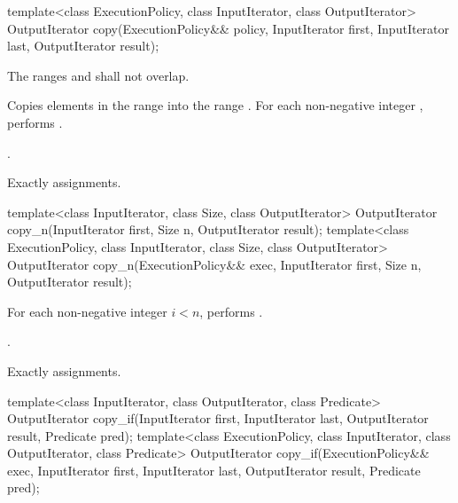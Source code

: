 %
\begin{itemdecl}
template<class ExecutionPolicy, class InputIterator, class OutputIterator>
  OutputIterator copy(ExecutionPolicy&& policy, InputIterator first, InputIterator last,
                      OutputIterator result);
\end{itemdecl}

\begin{itemdescr}
\pnum
\requires The ranges  and
 shall not overlap.

\pnum
\effects Copies elements in the range  into
the range .
For each non-negative integer ,
performs .

\pnum
\returns {}.

\pnum
\complexity Exactly  assignments.
\end{itemdescr}

%
\begin{itemdecl}
template<class InputIterator, class Size, class OutputIterator>
  OutputIterator copy_n(InputIterator first, Size n,
                        OutputIterator result);
template<class ExecutionPolicy, class InputIterator, class Size, class OutputIterator>
  OutputIterator copy_n(ExecutionPolicy&& exec,
                        InputIterator first, Size n,
                        OutputIterator result);
\end{itemdecl}

\begin{itemdescr}
\pnum
\effects For each non-negative integer
$i < n$, performs .

\pnum
\returns {}.

\pnum
\complexity Exactly  assignments.
\end{itemdescr}

%
\begin{itemdecl}
template<class InputIterator, class OutputIterator, class Predicate>
  OutputIterator copy_if(InputIterator first, InputIterator last,
                         OutputIterator result, Predicate pred);
template<class ExecutionPolicy, class InputIterator, class OutputIterator, class Predicate>
  OutputIterator copy_if(ExecutionPolicy&& exec,
                         InputIterator first, InputIterator last,
                         OutputIterator result, Predicate pred);
\end{itemdecl}

